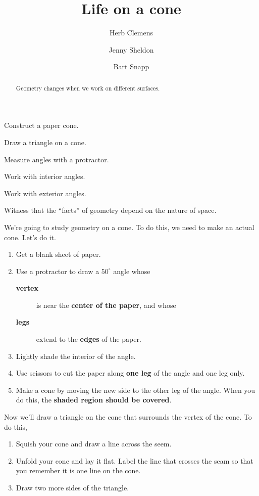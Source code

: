 \documentclass[nooutcomes,noauthor,handout,12pt]{ximera}
\title{Life on a cone}
\author{Herb Clemens \and Jenny Sheldon \and Bart Snapp}
\begin{document}
\begin{abstract}
  Geometry changes when we work on different surfaces.
\end{abstract}
\maketitle


\begin{listOutcomes}
\item Construct a paper cone.
\item Draw a triangle on a cone.
\item Measure angles with a protractor.
\item Work with interior angles.
\item Work with exterior angles.
\item Witness that the ``facts'' of geometry depend on the nature of
  space.
\end{listOutcomes}

We're going to study geometry on a cone. To do this, we need to
make an actual cone. Let's do it.

\begin{enumerate}
\item Get a blank sheet of paper.
\item Use a protractor to draw a $50^\circ$ angle whose
  \begin{description}
    \item[\textbf{vertex}] is near the \textbf{center of the paper}, and whose
    \item[\textbf{legs}] extend to the \textbf{edges} of the paper.
  \end{description}
  \item {Lightly shade the interior of the angle.}
  \item {Use scissors to cut the paper along \textbf{one leg} of the
    angle and one leg only.} 
    
  \item Make a cone by moving the new side to the other leg of the
    angle. When you do this, the \textbf{shaded region should be covered}.
\end{enumerate}

Now we'll draw a triangle on the cone that surrounds the vertex of the
cone. To do this,
\begin{enumerate}
\item Squish your cone and draw a line across the seem.
\item Unfold your cone and lay it flat. Label the line that crosses the seam so that you remember it is one line on the cone. 
\item Draw two more sides of the triangle.
\end{enumerate}
\end{document}
